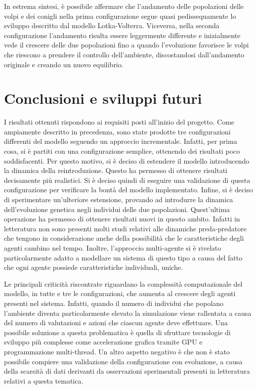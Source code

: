 \documentclass[11pt]{article}
\begin{document}
In estrema sintesi, è possibile affermare che l'andamento delle popolazioni delle volpi e dei conigli nella prima configurazione segue quasi pedissequamente lo sviluppo descritto dal modello Lotka-Volterra. Viceversa, nella seconda configurazione l'andamento risulta essere leggermente differente e inizialmente vede il crescere delle due popolazioni fino a quando l'evoluzione favorisce le volpi che riescono a prendere il controllo dell'ambiente, discostandosi dall'andamento originale e creando un nuovo equilibrio.   



\newpage 

\section{Conclusioni e sviluppi futuri}
I risultati ottenuti rispondono ai requisiti posti all'inizio del progetto. Come ampiamente descritto in precedenza, sono state prodotte tre configurazioni differenti del modello seguendo un approccio incrementale. Infatti, per prima cosa, si è partiti con una configurazione semplice, ottenendo dei risultati poco soddisfacenti. Per questo motivo, si è deciso di estendere il modello introducendo la dinamica della reintroduzione. Questo ha permesso di ottenere risultati decisamente più realistici. Si è deciso quindi di eseguire una validazione di questa configurazione per verificare la bontà del modello implementato. Infine, si è deciso di sperimentare un'ulteriore estensione, provando ad introdurre la dinamica dell'evoluzione genetica negli individui delle due popolazioni. Quest'ultima operazione ha permesso di ottenere risultati nuovi in questo ambito. Infatti in letteratura non sono presenti molti studi relativi alle dinamiche preda-predatore che tengono in considerazione anche della possibilità che le caratteristiche degli agenti cambino nel tempo. Inoltre, l'approccio multi-agente si è rivelato particolarmente adatto a modellare un sistema di questo tipo a causa del fatto che ogni agente possiede caratteristiche individuali, uniche.

Le principali criticità riscontrate riguardano la complessità computazionale del modello, in tutte e tre le configurazioni, che aumenta al crescere degli agenti presenti nel sistema. Infatti, quando il numero di individui che popolano l'ambiente diventa particolarmente elevato la simulazione viene rallentata a causa del numero di valutazioni e azioni che ciascun agente deve effettuare. Una possibile soluzione a questa problematica è quella di sfruttare tecnologie di sviluppo più complesse come accelerazione grafica tramite GPU e programmazione multi-thread.
Un altro aspetto negativo è che non è stato possibile compiere una validazione della configurazione con evoluzione, a causa della scarsità di dati derivanti da osservazioni sperimentali presenti in letteratura relativi a questa tematica.
\end{document}
